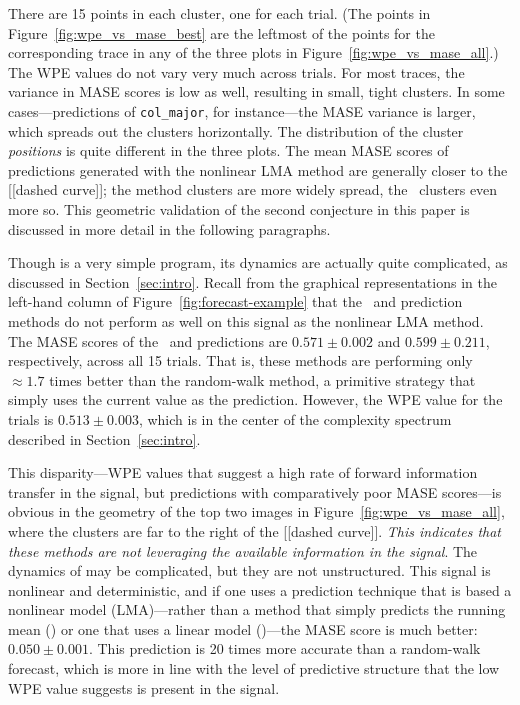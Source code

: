 There are 15 points in each cluster, one for each trial.  (The points
in Figure~\ref{fig:wpe_vs_mase_best} are the leftmost of the points
for the corresponding trace in any of the three plots in
Figure~\ref{fig:wpe_vs_mase_all}.)  The WPE values do not vary very
much across trials.  For most traces, the variance in MASE scores is
low as well, resulting in small, tight clusters.  In some
cases---\arima predictions of {\tt col\_major}, for instance---the
MASE variance is larger, which spreads out the clusters horizontally.
The distribution of the cluster \emph{positions} is quite different in
the three plots.  The mean MASE scores of predictions generated with
the nonlinear LMA method are generally closer to the [[dashed curve]];
the \arima method clusters are more widely spread, the \naive ~clusters
even more so.  This geometric validation of the second conjecture in
this paper is discussed in more detail in the following paragraphs.

Though \col is a very simple program, its dynamics are actually quite
complicated, as discussed in Section~\ref{sec:intro}.  Recall from the
graphical representations in the left-hand column of
Figure~\ref{fig:forecast-example} that the \naive ~and \arima
prediction methods do not perform as well on this signal as the
nonlinear LMA method.  The MASE scores of the \naive ~and \arima
predictions are $0.571 \pm 0.002$ and $0.599 \pm 0.211$, respectively,
across all 15 trials.  That is, these methods are performing only
$\approx 1.7$ times better than the random-walk method, a primitive
strategy that simply uses the current value as the prediction.
However, the WPE value for the \col trials is $0.513 \pm 0.003$, which
is in the center of the complexity spectrum described in
Section~\ref{sec:intro}.

This disparity---WPE values that suggest a high rate of forward
information transfer in the signal, but predictions with comparatively
poor MASE scores---is obvious in the geometry of the top two images in
Figure~\ref{fig:wpe_vs_mase_all}, where the \col clusters are far to
the right of the [[dashed curve]].  \emph{This indicates that these
  methods are not leveraging the available information in the signal}.
The dynamics of \col may be complicated, but they are not
unstructured.  This signal is nonlinear and
deterministic\cite{mytkowicz09}, and if one uses a prediction
technique that is based a nonlinear model (LMA)---rather than a method
that simply predicts the running mean (\naive) or one that uses a
linear model (\arima)---the MASE score is much better: $0.050 \pm
0.001$.  This prediction is 20 times more accurate than a random-walk
forecast, which is more in line with the level of predictive structure
that the low WPE value suggests is present in the signal.

